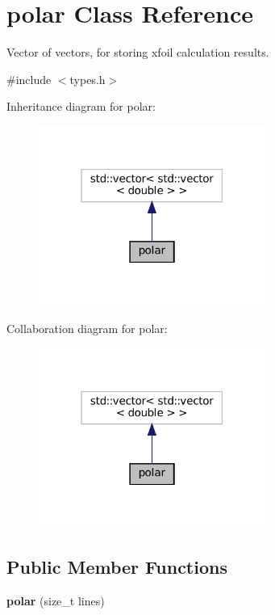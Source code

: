 \hypertarget{classpolar}{}\section{polar Class Reference}
\label{classpolar}


Vector of vectors, for storing xfoil calculation results.  




{\ttfamily \#include $<$types.\+h$>$}



Inheritance diagram for polar\+:
\nopagebreak
\begin{figure}[H]
\begin{center}
\leavevmode
\includegraphics[width=211pt]{classpolar__inherit__graph}
\end{center}
\end{figure}


Collaboration diagram for polar\+:
\nopagebreak
\begin{figure}[H]
\begin{center}
\leavevmode
\includegraphics[width=211pt]{classpolar__coll__graph}
\end{center}
\end{figure}
\subsection*{Public Member Functions}
\begin{DoxyCompactItemize}
\item 
\mbox{\label{classpolar_a98964526743174dcc56051b4e9ce4715}} 
{\bfseries polar} (size\+\_\+t lines)
\end{DoxyCompactItemize}
